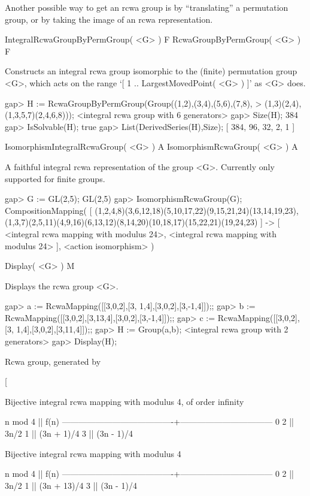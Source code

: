 Another possible way to get an rcwa group is by ``translating'' a
permutation group, or by taking the image of an rcwa representation.

\>IntegralRcwaGroupByPermGroup( <G> ) F
\>RcwaGroupByPermGroup( <G> ) F

Constructs an integral rcwa group isomorphic to the (finite) permutation
group <G>, which acts on the range `[ 1 .. LargestMovedPoint( <G> ) ]'
as <G> does.

\beginexample
gap> H := RcwaGroupByPermGroup(Group((1,2),(3,4),(5,6),(7,8),
>                                    (1,3)(2,4),(1,3,5,7)(2,4,6,8)));
<integral rcwa group with 6 generators>
gap> Size(H);
384
gap> IsSolvable(H);
true
gap> List(DerivedSeries(H),Size);
[ 384, 96, 32, 2, 1 ]
\endexample

\>IsomorphismIntegralRcwaGroup( <G> ) A
\>IsomorphismRcwaGroup( <G> ) A

A faithful integral rcwa representation of the group <G>.
Currently only supported for finite groups.

\beginexample
gap> G := GL(2,5);
GL(2,5)
gap> IsomorphismRcwaGroup(G);
CompositionMapping(
[ (1,2,4,8)(3,6,12,18)(5,10,17,22)(9,15,21,24)(13,14,19,23),
  (1,3,7)(2,5,11)(4,9,16)(6,13,12)(8,14,20)(10,18,17)(15,22,21)(19,24,23)
 ] -> [ <integral rcwa mapping with modulus 24>,
  <integral rcwa mapping with modulus 24> ], <action isomorphism> )             
\endexample

\>Display( <G> ) M

Displays the rcwa group <G>.

\beginexample
gap> a := RcwaMapping([[3,0,2],[3, 1,4],[3,0,2],[3,-1,4]]);;
gap> b := RcwaMapping([[3,0,2],[3,13,4],[3,0,2],[3,-1,4]]);;
gap> c := RcwaMapping([[3,0,2],[3, 1,4],[3,0,2],[3,11,4]]);;
gap> H := Group(a,b);
<integral rcwa group with 2 generators>
gap> Display(H);

Rcwa group, generated by

[

Bijective integral rcwa mapping with modulus 4, of order infinity

               n mod 4                  ||              f(n)              
----------------------------------------+---------------------------------
  0 2                                   || 3n/2
  1                                     || (3n + 1)/4
  3                                     || (3n - 1)/4


Bijective integral rcwa mapping with modulus 4

               n mod 4                  ||              f(n)              
----------------------------------------+---------------------------------
  0 2                                   || 3n/2
  1                                     || (3n + 13)/4
  3                                     || (3n - 1)/4

